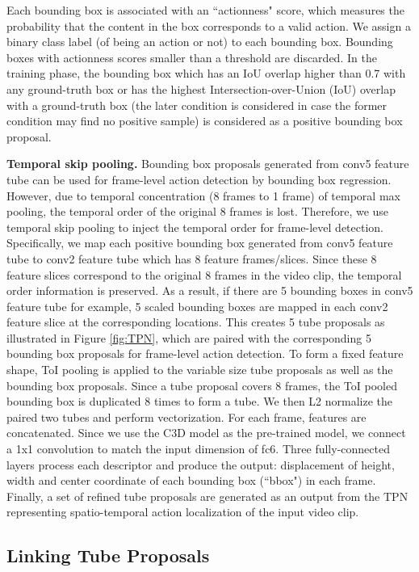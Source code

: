 \documentclass[10pt,twocolumn,letterpaper]{article}
\begin{document}
Each bounding box is associated with an ``actionness" score, which measures the probability that the content in the box corresponds to a valid action. We assign a binary class label (of being an action or not) to each bounding box. Bounding boxes with actionness scores smaller than a threshold are discarded. In the training phase, the bounding box which has an IoU overlap higher than 0.7 with any ground-truth box or has the highest Intersection-over-Union (IoU) overlap with a ground-truth box (the later condition is considered in case the former condition may find no positive sample) is considered as a positive bounding box proposal.



\textbf{Temporal skip pooling.} Bounding box proposals generated from conv5 feature tube can be used for frame-level action detection by bounding box regression. However, due to temporal concentration (8 frames to 1 frame) of temporal max pooling, the temporal order  of the original 8 frames is lost. Therefore, we use temporal skip pooling to inject the temporal order  for frame-level detection. Specifically, we map each positive bounding box generated from conv5 feature tube to conv2 feature tube which has 8 feature frames/slices. Since these 8 feature slices correspond to the original 8 frames in the video clip, the temporal order information is preserved. As a result, if there are 5 bounding boxes in conv5 feature tube for example, 5 scaled bounding boxes are mapped in each conv2 feature slice at the corresponding locations. This creates 5 tube proposals as illustrated in Figure \ref{fig:TPN}, which are paired with the corresponding 5 bounding box proposals for frame-level action detection. To form a fixed feature shape, ToI pooling is applied to the variable size tube proposals as well as the bounding box proposals. Since a tube proposal covers 8 frames, the ToI pooled bounding box is duplicated 8 times to form a tube. We then L2 normalize the paired two tubes and perform vectorization. For each frame, features are concatenated.
Since we use the C3D model \cite{c3d} as the pre-trained model, we connect a 1x1 convolution to match the input dimension of fc6.
Three fully-connected layers process each descriptor and produce the output: displacement of height, width and center coordinate of each bounding box (``bbox") in each frame. Finally, a set of refined tube proposals are generated as an output from the TPN representing spatio-temporal action localization of the input video clip.

\subsection{Linking Tube Proposals}
\label{subsec: link}
\end{document}
